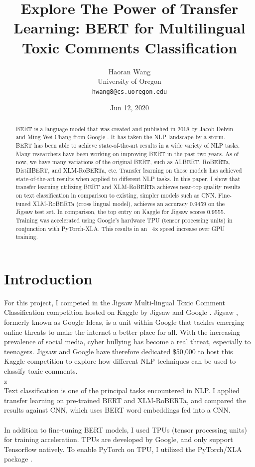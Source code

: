 \documentclass[11pt,a4paper]{article}
\title{Explore The Power of Transfer Learning: BERT for Multilingual Toxic Comments Classification}
\author{Haoran Wang \\
  University of Oregon \\
  {\tt hwang8@cs.uoregon.edu} }
\date{Jun 12, 2020}
\begin{document}
\maketitle
\begin{abstract}
BERT is a language model that was created and published in 2018 by Jacob Delvin and Ming-Wei Chang from Google \cite{BERT}. It has taken the NLP landscape by a storm. BERT has been able to achieve state-of-the-art results in a wide variety of NLP tasks. Many researchers have been working on improving BERT in the past two years. As of now, we have  many variations of the original BERT, such as ALBERT, RoBERTa, DistillBERT, and XLM-RoBERTa, etc. Transfer learning on those models has achieved state-of-the-art results when applied to different NLP tasks. In this paper, I show that transfer learning utilizing BERT and XLM-RoBERTa achieves near-top quality results on text classification in comparison to existing, simpler models such as CNN. Fine-tuned XLM-RoBERTa (cross lingual model), achieves an accuracy 0.9459 on the Jigsaw test set. In comparison, the top entry on Kaggle for Jigsaw scores 0.9555. Training was accelerated using Google's hardware TPU (tensor processing units) in conjunction with PyTorch-XLA. This results in an ~4x speed increase over GPU training.
\end{abstract}

\section{Introduction}

For this project, I competed in the Jigsaw Multi-lingual Toxic Comment Classification competition hosted on Kaggle by Jigsaw and Google \cite{kaggle}. Jigsaw \cite{jigsaw}, formerly known as Google Ideas, is a unit within Google that tackles emerging online threats to make the internet a better place for all. With the increasing prevalence of social media, cyber bullying has become a real threat, especially to teenagers. Jigsaw and Google have therefore dedicated \$50,000 to host this Kaggle competition to explore how different NLP techniques can be used to classify toxic comments.\\z
\\
Text classification is one of the principal tasks encountered in NLP. I applied transfer learning on pre-trained BERT and XLM-RoBERTa, and compared the results against CNN, which uses BERT word embeddings fed into a CNN.\\
\\
In addition to fine-tuning BERT models, I used TPUs (tensor processing units) for training acceleration. TPUs are developed by Google, and only support Tensorflow natively. To enable PyTorch on TPU, I utilized the PyTorch/XLA package \cite{xla}.
\end{document}
